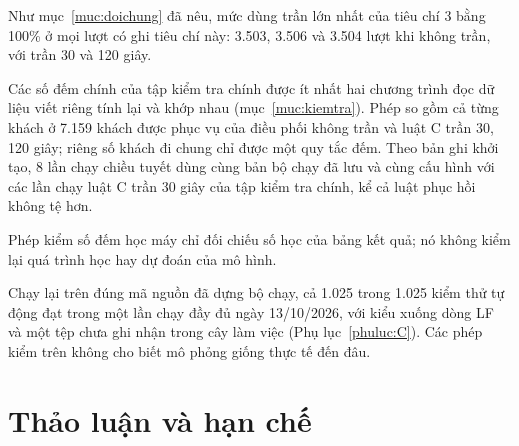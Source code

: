 Như mục~\ref{muc:doichung} đã nêu, mức dùng trần lớn nhất của tiêu chí 3 bằng 100\% ở mọi lượt có ghi tiêu chí này:
3.503, 3.506 và 3.504 lượt khi không trần, với trần 30 và 120 giây.

Các số đếm chính của tập kiểm tra chính được ít nhất hai chương trình đọc dữ liệu viết riêng tính lại và khớp nhau
(mục~\ref{muc:kiemtra}). Phép so gồm cả từng khách ở 7.159 khách được phục vụ của điều phối không trần và luật C trần
30, 120 giây; riêng số khách đi chung chỉ được một quy tắc đếm. Theo bản ghi khởi tạo, 8 lần chạy chiều tuyết dùng cùng
bản bộ chạy đã lưu và cùng cấu hình với các lần chạy luật C trần 30 giây của tập kiểm tra chính, kể cả luật phục hồi
không tệ hơn.

Phép kiểm số đếm học máy chỉ đối chiếu số học của bảng kết quả; nó không kiểm lại quá trình học hay dự đoán của mô hình.

Chạy lại trên đúng mã nguồn đã dựng bộ chạy, cả 1.025 trong 1.025 kiểm thử tự động đạt trong một lần chạy đầy đủ ngày
13/10/2026, với kiểu xuống dòng LF và một tệp chưa ghi nhận trong cây làm việc (Phụ lục~\ref{phuluc:C}). Các phép kiểm
trên không cho biết mô phỏng giống thực tế đến đâu.



\section{Thảo luận và hạn chế}
\label{muc:c4-thaoluan}

